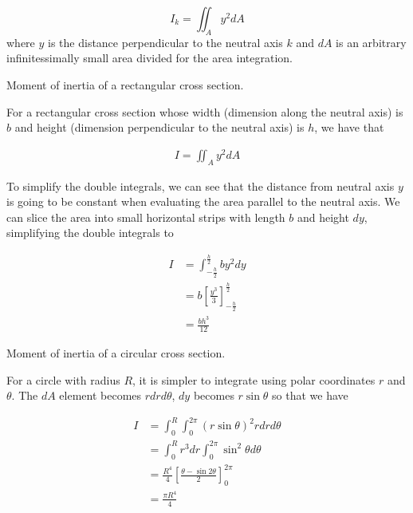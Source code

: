 \documentclass[
10pt,
a4paper,
openany,
svgnames,
]{book}
\begin{document}
\begin{equation}
  I_k = \iint_A y^2 dA
\end{equation} 
where $y$ is the distance perpendicular to the neutral axis $k$ and $dA$ is an arbitrary infinitessimally small area divided for the area integration.

\begin{example} Moment of inertia of a rectangular cross section.

  For a rectangular cross section whose width (dimension along the neutral axis) is $b$ and height (dimension perpendicular to the neutral axis) is $h$, we have that

  \begin{align*}
    I = \iint_A y^2 dA
  \end{align*}

  To simplify the double integrals, we can see that the distance from neutral axis $y$ is going to be constant when evaluating the area parallel to the neutral axis. We can slice the area into small horizontal strips with length $b$ and height $dy$, simplifying the double integrals to 

  \begin{align*}
    I &= \int_{-\frac{h}{2}}^{\frac{h}{2}} by^2dy \\
      &= b \left[ \frac{y^3}{3} \right]_{-\frac{h}{2}}^{\frac{h}{2}} \\
      &= \frac{bh^3}{12}
  \end{align*}
  
\end{example}

\begin{example} Moment of inertia of a circular cross section.

  For a circle with radius $R$, it is simpler to integrate using polar coordinates $r$ and $\theta$. The $dA$ element becomes $rdrd\theta$, $dy$ becomes $r \sin \theta$ so that we have

  \begin{align*}
    I &= \int_0^R \int_0^{2\pi} \left( r \sin \theta \right)^2 r dr d\theta \\
      &= \int_0^R r^3 dr \int_0^{2\pi} \sin^2 \theta d\theta \\
      &= \frac{R^4}{4} \left[ \frac{\theta - \sin 2\theta}{2} \right]_0^{2\pi} \\
      &= \frac{\pi R^4}{4}
  \end{align*}

\end{example}
\end{document}
